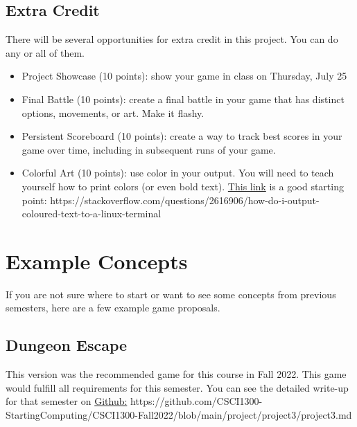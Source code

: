 \subsection{Extra Credit}
There will be several opportunities for extra credit in this project. You can do any or all of them.
\begin{itemize}
    \item Project Showcase (10 points): show your game in class on Thursday, July 25
    \item Final Battle (10 points): create a final battle in your game that has distinct options, movements, or art. Make it flashy.
    \item Persistent Scoreboard (10 points): create a way to track best scores in your game over time, including in subsequent runs of your game. 
    \item Colorful Art (10 points): use color in your output. You will need to teach yourself how to print colors (or even bold text). \textcolor{cyan}{\href{https://stackoverflow.com/questions/2616906/how-do-i-output-coloured-text-to-a-linux-terminal}{This link}} is a good starting point: https://stackoverflow.com/questions/2616906/how-do-i-output-coloured-text-to-a-linux-terminal
\end{itemize}

\section{Example Concepts}
If you are not sure where to start or want to see some concepts from previous semesters, here are a few example game proposals. 

\subsection{Dungeon Escape}
This version was the recommended game for this course in Fall 2022. This game would fulfill all requirements for this semester. You can see the detailed write-up for that semester on \textcolor{cyan}{\href{https://github.com/CSCI1300-StartingComputing/CSCI1300-Fall2022/blob/main/project/project3/project3.md}{Github:}} https://github.com/CSCI1300-StartingComputing/CSCI1300-Fall2022/blob/main/project/project3/project3.md

